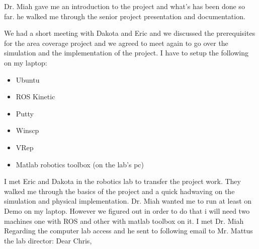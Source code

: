 \documentclass[fontsize=11pt, %
                             paper=letter, %
                             twoside, %
                             captions=tableheading,
                             index=totoc,
                             hyperref]{labbook}
\begin{document}
\begin{addmargin}[0cm]{0cm} %

\pagestyle{scrheadings} %





Dr. Miah gave me an introduction to the project and what's has been done so far. he walked me through the senior project presentation and documentation.  

 




We had a short meeting with Dakota and Eric and we discussed the prerequisites for the area coverage project and we agreed to meet again to go over the simulation and the implementation of the project.
\bigbreak\noindent
I have to setup the following on my laptop:
\begin{itemize}
\item Ubuntu
\item ROS Kinetic
\item Putty
\item Winscp
\item VRep
\item Matlab robotics toolbox (on the lab's pc)
\end{itemize}


I met Eric and Dakota in the robotics lab to transfer the project work. 
\bigbreak\noindent
They walked me through the basics of the project and a quick hadwaving on the simulation and physical implementation. 
\bigbreak\noindent
Dr. Miah wanted me to run at least on Demo on my laptop. However we figured out in order to do that i will need two machines one with ROS and other with matlab toolbox on it. 
I met Dr. Miah Regarding the computer lab access and he sent to following email to Mr. Mattus the lab director:
\bigbreak\noindent
Dear Chris,


\end{addmargin}
\end{document}

